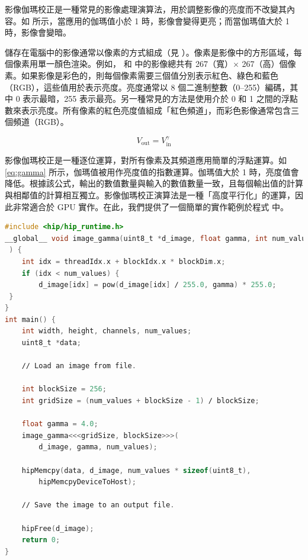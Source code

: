 影像伽瑪校正是一種常見的影像處理演算法，用於調整影像的亮度而不改變其內容。如  所示，當應用的伽瑪值小於 1 時，影像會變得更亮；而當伽瑪值大於 1 時，影像會變暗。

儲存在電腦中的影像通常以像素的方式組成（見 ）。像素是影像中的方形區域，每個像素用單一顏色渲染。例如， 和   中的影像總共有 267（寬）× 267（高）個像素。如果影像是彩色的，則每個像素需要三個值分別表示紅色、綠色和藍色（RGB），這些值用於表示亮度。亮度通常以 8 個二進制整數（0–255）編碼，其中 0 表示最暗，255 表示最亮。另一種常見的方法是使用介於 0 和 1 之間的浮點數來表示亮度。所有像素的紅色亮度值組成「紅色頻道」，而彩色影像通常包含三個頻道（RGB）。

\begin{equation}
    V_{\text{out}} = V_{\text{in}}^{\gamma} \tag{8.1}
    \label{eq:gamma}
\end{equation}

影像伽瑪校正是一種逐位運算，對所有像素及其頻道應用簡單的浮點運算。如 \ref{eq:gamma} 所示，伽瑪值被用作亮度值的指數運算。伽瑪值大於 1 時，亮度值會降低。根據該公式，輸出的數值數量與輸入的數值數量一致，且每個輸出值的計算與相鄰值的計算相互獨立。影像伽瑪校正演算法是一種「高度平行化」的運算，因此非常適合於 GPU 實作。在此，我們提供了一個簡單的實作範例於程式  中。

\begin{lstlisting}[language=C, caption={影像伽瑪校正應用作為一種「高度平行化」的演算法。每個 thread 負責處理影像像素陣列中的一個數值。Grid size 則反映了像素數量。}, captionpos=t, label={lst:gamma}]
#include <hip∕hip_runtime.h>
__global__ void image_gamma(uint8_t *d_image, float gamma, int num_values
 ) {
    int idx = threadIdx.x + blockIdx.x * blockDim.x;
    if (idx < num_values) {
        d_image[idx] = pow(d_image[idx] ∕ 255.0, gamma) * 255.0;
 }
}
int main() {
    int width, height, channels, num_values;
    uint8_t *data;

    ∕∕ Load an image from file.

    int blockSize = 256;
    int gridSize = (num_values + blockSize - 1) ∕ blockSize;

    float gamma = 4.0;
    image_gamma<<<gridSize, blockSize>>>(
        d_image, gamma, num_values);

    hipMemcpy(data, d_image, num_values * sizeof(uint8_t),
        hipMemcpyDeviceToHost);

    ∕∕ Save the image to an output file.

    hipFree(d_image);
    return 0;
}
\end{lstlisting}

